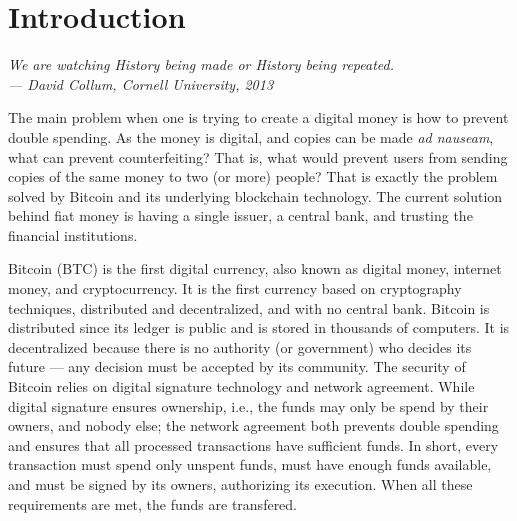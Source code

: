 


\chapter{Introduction}



\bigskip

\begin{flushright}{\slshape
    {We are watching History being made or History being repeated.}
	\\ \medskip
    --- David Collum, Cornell University, 2013}
\end{flushright}
\bigskip
\bigskip

The main problem when one is trying to create a digital money is how to prevent double spending. As the money is digital, and copies can be made \textit{ad nauseam}, what can prevent counterfeiting? That is, what would prevent users from sending copies of the same money to two (or more) people? That is exactly the problem solved by Bitcoin and its underlying blockchain technology. The current solution behind fiat money is having a single issuer, a central bank, and trusting the financial institutions.

Bitcoin (BTC) is the first digital currency, also known as digital money, internet money, and cryptocurrency. It is the first currency based on cryptography techniques, distributed and decentralized, and with no central bank. Bitcoin is distributed since its ledger is public and is stored in thousands of computers. It is decentralized because there is no authority (or government) who decides its future --- any decision must be accepted by its community. The security of Bitcoin relies on digital signature technology and network agreement. While digital signature ensures ownership, i.e., the funds may only be spend by their owners, and nobody else; the network agreement both prevents double spending and ensures that all processed transactions have sufficient funds. In short, every transaction must spend only unspent funds, must have enough funds available, and must be signed by its owners, authorizing its execution. When all these requirements are met, the funds are transfered.

